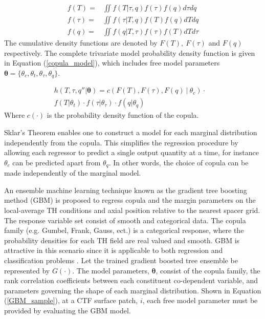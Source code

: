 \documentclass{anstrans}
\begin{document}
\begin{eqnarray}
f(T) =&  \iint f(T|\tau, q) f(\tau)f(q) d\tau dq  \nonumber \\
 f(\tau) =& \iint f(\tau | T, q) f(T)f(q) dT dq  \nonumber \\
  f(q) =& \iint f(q| T, \tau) f(\tau)f(T) dT d\tau
  \label{Margins}
  \end{eqnarray}
The cumulative density functions are denoted by $F(T),\ F(\tau)$ and $F(q)$ respectively. The complete trivariate model
probability density function is given in Equation (\ref{copula_model}), which includes free model parameters $\bm \theta = \{\theta_c, \theta_t, \theta_{\tau}, \theta_q\}$.

\begin{eqnarray}
 h(T, \tau, q''|\bm \theta) = c(F(T), F(\tau), F(q)\ |\ \theta_c) \cdot & \nonumber \\
f(T|\theta_t) \cdot f(\tau|\theta_{\tau}) \cdot f(q|\theta_q)
\label{copula_model}
\end{eqnarray}
Where $c(\cdot)$ is the probability density function of the copula. 

Sklar's Theorem enables one to construct a model for each marginal distribution independently from the copula.  This simplifies the regression procedure by allowing each regressor to predict a single output quantity at a time, for instance $\theta_c$ can be predicted apart from $\theta_q$.  In other words, the choice of copula can be made independently of the marginal model.

An ensemble machine learning technique known as the gradient tree boosting method
 (GBM) is proposed to regress copula and the margin parameters on the
local-average TH conditions and axial position relative to the nearest spacer grid.  The
response variable set consist of smooth and categorical data.  The copula
family (e.g. Gumbel, Frank, Gauss, ect.) is a categorical response, where the probability
densities for each TH field are real valued and smooth.  GBM is attractive in this scenario since
it is applicable to both regression and
classification problems \cite{friedman2002}. Let the trained gradient boosted tree ensemble be represented by $G(\cdot)$. 
The model parameters, $\bm \theta$, consist of the copula family, the rank correlation coefficients between each constituent co-dependent variable, and parameters governing the shape of each marginal distribution.  Shown in Equation (\ref{GBM_sample}), at a CTF surface patch, $i$, each free model parameter must be provided by evaluating the GBM model.
\end{document}

